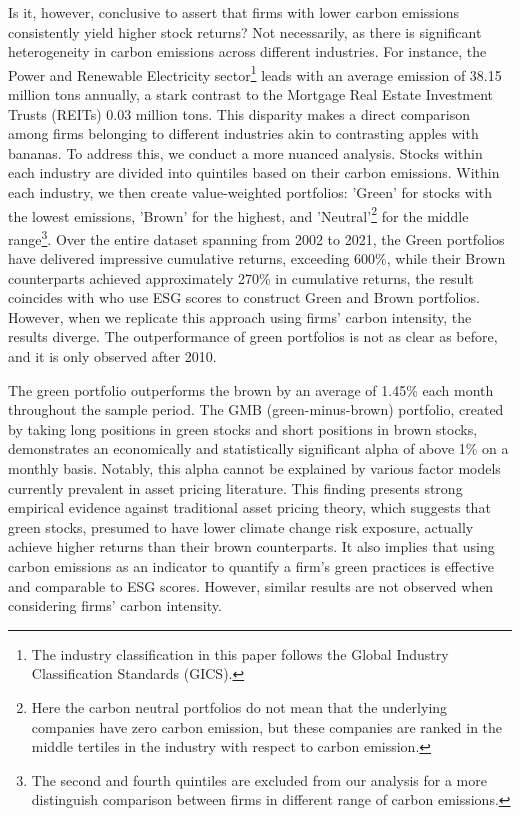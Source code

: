 \documentclass[12pt]{article}
\begin{document}
Is it, however, conclusive to assert that firms with lower carbon emissions consistently yield higher stock returns? Not necessarily, as there is significant heterogeneity in carbon emissions across different industries. For instance, the Power and Renewable Electricity sector\footnote{The industry classification in this paper follows the Global Industry Classification Standards (GICS).} leads with an average emission of 38.15 million tons annually, a stark contrast to the Mortgage Real Estate Investment Trusts (REITs) 0.03 million tons. This disparity makes a direct comparison among firms belonging to different industries akin to contrasting apples with bananas. To address this, we conduct a more nuanced analysis. Stocks within each industry are divided into quintiles based on their carbon emissions. Within each industry, we then create value-weighted portfolios: 'Green' for stocks with the lowest emissions, 'Brown' for the highest, and 'Neutral'\footnote{Here the carbon neutral portfolios do not mean that the underlying companies have zero carbon emission, but these companies are ranked in the middle tertiles in the industry with respect to carbon emission.} for the middle range\footnote{The second and fourth quintiles are excluded from our analysis for a more distinguish comparison between firms in different range of carbon emissions.}. Over the entire dataset spanning from 2002 to 2021, the Green portfolios have delivered impressive cumulative returns, exceeding 600\%, while their Brown counterparts achieved approximately 270\% in cumulative returns, the result coincides with \cite{pastor2022dissecting} who use ESG scores to construct Green and Brown portfolios. However, when we replicate this approach using firms' carbon intensity, the results diverge. The outperformance of green portfolios is not as clear as before, and it is only observed after 2010.

The green portfolio outperforms the brown by an average of 1.45\% each month throughout the sample period. The GMB (green-minus-brown) portfolio, created by taking long positions in green stocks and short positions in brown stocks, demonstrates an economically and statistically significant alpha of above 1\% on a monthly basis. Notably, this alpha cannot be explained by various factor models currently prevalent in asset pricing literature. This finding presents strong empirical evidence against traditional asset pricing theory, which suggests that green stocks, presumed to have lower climate change risk exposure, actually achieve higher returns than their brown counterparts. It also implies that using carbon emissions as an indicator to quantify a firm's green practices is effective and comparable to ESG scores. However, similar results are not observed when considering firms' carbon intensity.
\end{document}
